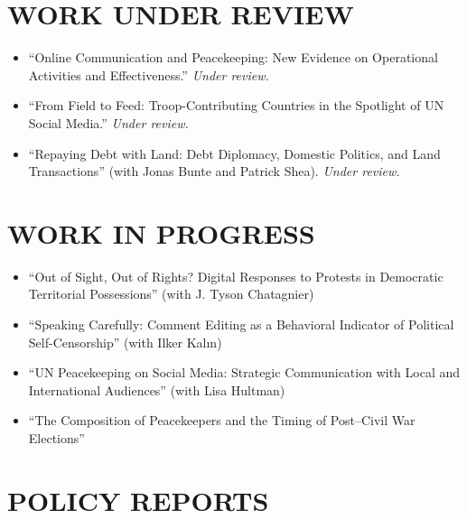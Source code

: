 \documentclass[11pt,a4paper,roman]{moderncv}
\begin{document}
\section{WORK UNDER REVIEW}

\begin{itemize}
  \item ``Online Communication and Peacekeeping: New Evidence on Operational Activities and Effectiveness.'' \textit{Under review.}
  \item ``From Field to Feed: Troop-Contributing Countries in the Spotlight of UN Social Media.'' \textit{Under review.}
  \item ``Repaying Debt with Land: Debt Diplomacy, Domestic Politics, and Land Transactions'' (with Jonas Bunte and Patrick Shea). \textit{Under review.}
\end{itemize}

\section{WORK IN PROGRESS}

\begin{itemize}
  \item ``Out of Sight, Out of Rights? Digital Responses to Protests in Democratic Territorial Possessions'' (with J. Tyson Chatagnier)
  \item ``Speaking Carefully: Comment Editing as a Behavioral Indicator of Political Self-Censorship'' (with Ilker Kal{\i}n)
  \item ``UN Peacekeeping on Social Media: Strategic Communication with Local and International Audiences'' (with Lisa Hultman)
  \item ``The Composition of Peacekeepers and the Timing of Post--Civil War Elections''
\end{itemize}

\section{POLICY REPORTS}
\end{document}
